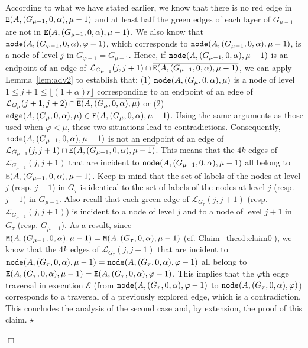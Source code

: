 \documentclass[11pt]{article}
\newcommand{\qed}{\hfill $\Box$ \bigbreak}
\newenvironment{proof}{\noindent {\bf Proof.}}{\qed}
\newenvironment{proofclaim}{\noindent{\bf Proof of the claim.}}{\hfill$\star$}
\begin{document}
{\begin{proof}
\begin{proofclaim}
According to what we have stated earlier, we know that there is no red edge in ${\tt E}(A,(G_{\mu-1},0,\alpha),\mu-1)$ and at least half the green edges of each layer of $G_{\mu-1}$ are not in ${\tt E}(A,(G_{\mu-1},0,\alpha),\mu-1)$. We also know that ${\tt node}(A,(G_{\varphi-1},0,\alpha),\varphi-1)$, which corresponds to ${\tt node}(A,(G_{\mu-1},0,\alpha),\mu-1)$, is a node of level $j$ in $G_{\varphi-1}=G_{\mu-1}$. Hence, if ${\tt node}(A,(G_{\mu-1},0,\alpha),\mu-1)$ is an endpoint of an edge of $\mathcal{L}_{G_{\mu-1}}(j,j+1)\cap\overline{{\tt E}(A,(G_{\mu-1},0,\alpha),\mu-1)}$, we can apply Lemma~\ref{lem:adv2} to establish that: (1) ${\tt node}(A,(G_{\mu},0,\alpha),\mu)$ is a node of level $1\leq j+1\leq\lfloor(1+\alpha)r\rfloor$ corresponding to an endpoint of an edge of $\mathcal{L}_{G_\mu}(j+1,j+2)\cap\overline{{\tt E}(A,(G_\mu,0,\alpha),\mu)}$ or (2) ${\tt edge}(A,(G_{\mu},0,\alpha),\mu)\in{\tt E}(A,(G_{\mu},0,\alpha),\mu-1)$. Using the same arguments as those used when $\varphi<\mu$, these two situations lead to contradictions. Consequently, ${\tt node}(A,(G_{\mu-1},0,\alpha),\mu-1)$ is not an endpoint of an edge of $\mathcal{L}_{G_{\mu-1}}(j,j+1)\cap\overline{{\tt E}(A,(G_{\mu-1},0,\alpha),\mu-1)}$. This means that the $4k$ edges of $\mathcal{L}_{G_{\mu-1}}(j,j+1)$ that are incident to ${\tt node}(A,(G_{\mu-1},0,\alpha),\mu-1)$  all belong to ${\tt E}(A,(G_{\mu-1},0,\alpha),\mu-1)$. Keep in mind that the set of labels of the nodes at level $j$ (resp. $j+1$) in $G_{\tau}$ is identical to the set of labels of the nodes at level $j$ (resp. $j+1$) in $G_{\mu-1}$. Also recall that each green edge of $\mathcal{L}_{G_{\tau}}(j,j+1)$ (resp. $\mathcal{L}_{G_{\mu-1}}(j,j+1)$) is incident to a node of level $j$ and to a node of level $j+1$ in $G_{\tau}$ (resp. $G_{\mu-1}$). As a result,  since ${\tt M}(A,(G_{\mu-1},0,\alpha),\mu-1)={\tt M}(A,(G_\tau,0,\alpha),\mu-1)$ (cf. Claim~\ref{theo1:claim0}), we know that the $4k$ edges of $\mathcal{L}_{G_{\tau}}(j,j+1)$ that are incident to ${\tt node}(A,(G_{\tau},0,\alpha),\mu-1)={\tt node}(A,(G_{\tau},0,\alpha),\varphi-1)$ all belong to ${\tt E}(A,(G_{\tau},0,\alpha),\mu-1)={\tt E}(A,(G_{\tau},0,\alpha),\varphi-1)$. This implies that the $\varphi$th edge traversal in execution $\mathcal{E}$ (from ${\tt node}(A,(G_{\tau},0,\alpha),\varphi-1)$ to ${\tt node}(A,(G_{\tau},0,\alpha),\varphi)$) corresponds to a traversal of a previously explored edge, which is a contradiction. This concludes the analysis of the second case and, by extension, the proof of this claim.
\end{proofclaim}


\end{proof}}
\end{document}
